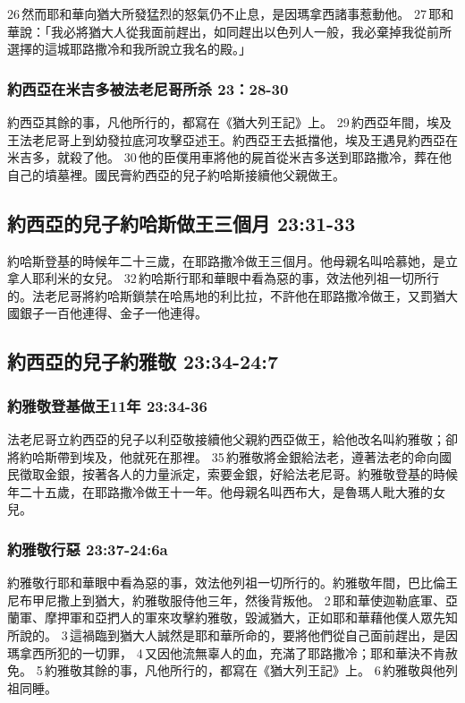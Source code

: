 26 然而耶和華向猶大所發猛烈的怒氣仍不止息，是因瑪拿西諸事惹動他。 27 耶和華說：「我必將猶大人從我面前趕出，如同趕出以色列人一般，我必棄掉我從前所選擇的這城耶路撒冷和我所說立我名的殿。」

\subsubsection{約西亞在米吉多被法老尼哥所杀 23：28-30}
約西亞其餘的事，凡他所行的，都寫在《猶大列王記》上。 29 約西亞年間，埃及王法老尼哥上到幼發拉底河攻擊亞述王。約西亞王去抵擋他，埃及王遇見約西亞在米吉多，就殺了他。 30 他的臣僕用車將他的屍首從米吉多送到耶路撒冷，葬在他自己的墳墓裡。國民膏約西亞的兒子約哈斯接續他父親做王。



\subsection{約西亞的兒子約哈斯做王三個月 23:31-33}
約哈斯登基的時候年二十三歲，在耶路撒冷做王三個月。他母親名叫哈慕她，是立拿人耶利米的女兒。 32 約哈斯行耶和華眼中看為惡的事，效法他列祖一切所行的。法老尼哥將約哈斯鎖禁在哈馬地的利比拉，不許他在耶路撒冷做王，又罰猶大國銀子一百他連得、金子一他連得。

\subsection{約西亞的兒子約雅敬 23:34-24:7}
\subsubsection{約雅敬登基做王11年 23:34-36}
法老尼哥立約西亞的兒子以利亞敬接續他父親約西亞做王，給他改名叫約雅敬；卻將約哈斯帶到埃及，他就死在那裡。 35 約雅敬將金銀給法老，遵著法老的命向國民徵取金銀，按著各人的力量派定，索要金銀，好給法老尼哥。約雅敬登基的時候年二十五歲，在耶路撒冷做王十一年。他母親名叫西布大，是魯瑪人毗大雅的女兒。 


\subsubsection{約雅敬行惡 23:37-24:6a}
約雅敬行耶和華眼中看為惡的事，效法他列祖一切所行的。約雅敬年間，巴比倫王尼布甲尼撒上到猶大，約雅敬服侍他三年，然後背叛他。 2 耶和華使迦勒底軍、亞蘭軍、摩押軍和亞捫人的軍來攻擊約雅敬，毀滅猶大，正如耶和華藉他僕人眾先知所說的。 3 這禍臨到猶大人誠然是耶和華所命的，要將他們從自己面前趕出，是因瑪拿西所犯的一切罪， 4 又因他流無辜人的血，充滿了耶路撒冷；耶和華決不肯赦免。 5 約雅敬其餘的事，凡他所行的，都寫在《猶大列王記》上。 6 約雅敬與他列祖同睡。


